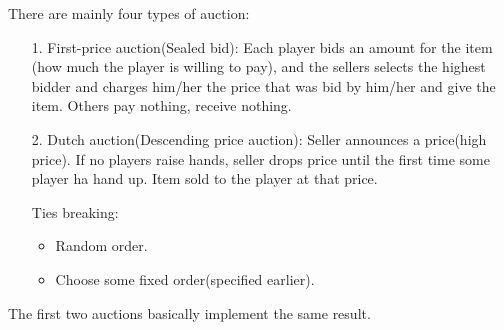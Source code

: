 \begin{eg}
	There are mainly four types of auction:
	\begin{enumerate}
		\item[1.] First-price auction(Sealed bid): Each player bids an amount for the item (how much the player is willing to pay), and the sellers selects
			the highest bidder and charges him/her the price that was bid by him/her and give the item. Others pay nothing, receive nothing.
		\item[2.] Dutch auction(Descending price auction): Seller announces a price(high price). If no players raise hands, seller drops price until
			the first time some player ha hand up. Item sold to the player at that price.
			\par Ties breaking:
			\begin{itemize}
				\item Random order.
				\item Choose some fixed order(specified earlier).
			\end{itemize}
	\end{enumerate}
	\begin{remark}
		The first two auctions basically implement the same result.
	\end{remark}
\end{eg}